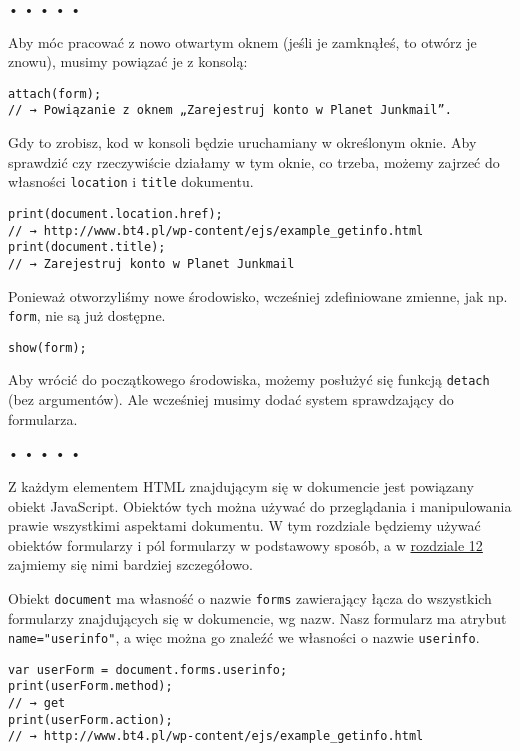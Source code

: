 \begin{center}
• • • • •
\end{center}

  
Aby móc pracować z nowo otwartym oknem (jeśli je zamknąłeś, to otwórz je znowu), musimy powiązać je z konsolą:

  
\begin{verbatim} 
attach(form);
// → Powiązanie z oknem „Zarejestruj konto w Planet Junkmail”.
\end{verbatim}
  
Gdy to zrobisz, kod w konsoli będzie uruchamiany w określonym oknie. Aby sprawdzić czy rzeczywiście działamy w tym oknie, co trzeba, możemy zajrzeć do własności \texttt{location} i \texttt{title} dokumentu.

  
\begin{verbatim} 
print(document.location.href);
// → http://www.bt4.pl/wp-content/ejs/example_getinfo.html
print(document.title);
// → Zarejestruj konto w Planet Junkmail
\end{verbatim}
  
Ponieważ otworzyliśmy nowe środowisko, wcześniej zdefiniowane zmienne, jak np. \texttt{form}, nie są już dostępne.

  
\begin{verbatim} 
show(form);
\end{verbatim}
  
Aby wrócić do początkowego środowiska, możemy posłużyć się funkcją \texttt{detach} (bez argumentów). Ale wcześniej musimy dodać system sprawdzający do formularza.



\begin{center}
• • • • •
\end{center}

  
Z każdym elementem HTML znajdującym się w dokumencie jest powiązany obiekt JavaScript. Obiektów tych można używać do przeglądania i manipulowania prawie wszystkimi aspektami dokumentu. W tym rozdziale będziemy używać obiektów formularzy i pól formularzy w podstawowy sposób, a w \hyperref[chap:12]{rozdziale 12} zajmiemy się nimi bardziej szczegółowo.

  
Obiekt \texttt{document} ma własność o nazwie \texttt{forms} zawierający łącza do wszystkich formularzy znajdujących się w dokumencie, wg nazw. Nasz formularz ma atrybut \texttt{name="userinfo"}, a więc można go znaleźć we własności o nazwie \texttt{userinfo}.

  
\begin{verbatim} 
var userForm = document.forms.userinfo;
print(userForm.method);
// → get
print(userForm.action);
// → http://www.bt4.pl/wp-content/ejs/example_getinfo.html
\end{verbatim}
  
